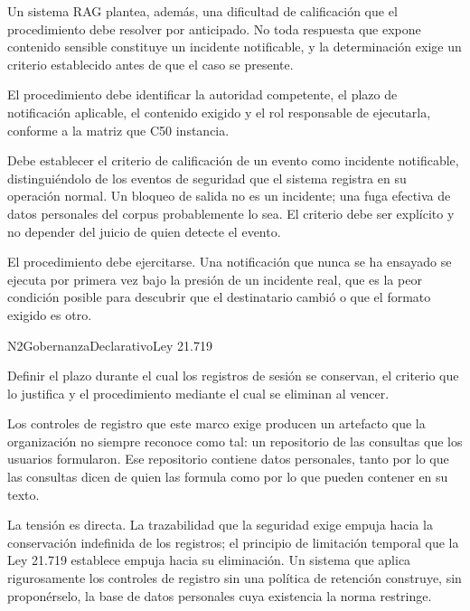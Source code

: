 Un sistema RAG plantea, además, una dificultad de calificación que el procedimiento debe resolver por anticipado. No toda respuesta que expone contenido sensible constituye un incidente notificable, y la determinación exige un criterio establecido antes de que el caso se presente.

El procedimiento debe identificar la autoridad competente, el plazo de notificación aplicable, el contenido exigido y el rol responsable de ejecutarla, conforme a la matriz que C50 instancia.

Debe establecer el criterio de calificación de un evento como incidente notificable, distinguiéndolo de los eventos de seguridad que el sistema registra en su operación normal. Un bloqueo de salida no es un incidente; una fuga efectiva de datos personales del corpus probablemente lo sea. El criterio debe ser explícito y no depender del juicio de quien detecte el evento.

El procedimiento debe ejercitarse. Una notificación que nunca se ha ensayado se ejecuta por primera vez bajo la presión de un incidente real, que es la peor condición posible para descubrir que el destinatario cambió o que el formato exigido es otro.


  {N2}{Gobernanza}{Declarativo}{Ley 21.719}

Definir el plazo durante el cual los registros de sesión se conservan, el criterio que lo justifica y el procedimiento mediante el cual se eliminan al vencer.

Los controles de registro que este marco exige producen un artefacto que la organización no siempre reconoce como tal: un repositorio de las consultas que los usuarios formularon. Ese repositorio contiene datos personales, tanto por lo que las consultas dicen de quien las formula como por lo que pueden contener en su texto.

La tensión es directa. La trazabilidad que la seguridad exige empuja hacia la conservación indefinida de los registros; el principio de limitación temporal que la Ley 21.719 establece empuja hacia su eliminación. Un sistema que aplica rigurosamente los controles de registro sin una política de retención construye, sin proponérselo, la base de datos personales cuya existencia la norma restringe.

